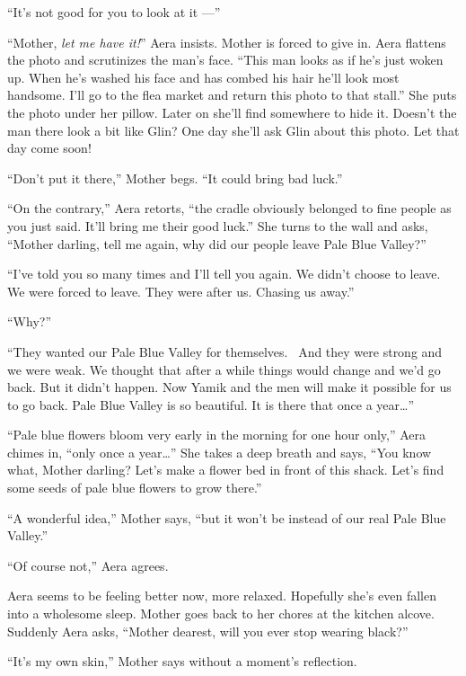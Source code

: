 \documentclass[twoside,11pt,openany]{book}
\begin{document}
``It's not good for you to look at it ---''

``Mother, \textit{let me have it!}'' Aera insists. Mother is forced to give in. Aera flattens
the photo and scrutinizes the man's face. ``This man looks as if he's just woken up. When he's washed his
face and has combed his hair he'll look most handsome. I'll go to the flea market and return this photo to that
stall.'' She puts the photo under her pillow. Later on she'll find somewhere to hide it. Doesn't the man
there look a bit like Glin? One day she'll ask Glin about this photo.  Let that day come soon!

``Don't put it there,'' Mother begs. ``It could bring bad luck.''

``On the contrary,'' Aera retorts, ``the cradle obviously belonged to fine people
as you just said. It'll bring me their good luck.'' She turns to the wall and asks, ``Mother
darling, tell me again, why did our people leave Pale Blue Valley?''

``I've told you so many times and I'll tell you again. We didn't choose to leave. We were forced to
leave. They were after us. Chasing us away.''

``Why?''

``They wanted our Pale Blue Valley for themselves. ~And they were strong and we were weak. We thought that
after  a while things would change and we'd go back. But it didn't happen. Now Yamik and the men will make it
possible for us to go back. Pale Blue Valley is so beautiful. It is there that once a year{\ldots}''

 ``Pale blue flowers bloom very early in the morning for one hour only,'' Aera chimes in, ``only once a
year{\ldots}'' She takes a deep breath and says, ``You know what, Mother darling? Let's make
a flower bed in front of this shack. Let's find some seeds of pale blue flowers to grow there.''

``A wonderful idea,'' Mother says, ``but it won't be instead of our real Pale
Blue Valley.''

``Of course not,'' Aera agrees.

 Aera seems to be feeling better now, more relaxed. Hopefully she's even fallen into a wholesome sleep. Mother goes back
to her chores at the kitchen alcove. Suddenly Aera asks, ``Mother dearest, will you ever stop wearing
black?''

``It's my{ }own skin,'' Mother says without a moment's reflection.



\chapter{}
\end{document}
